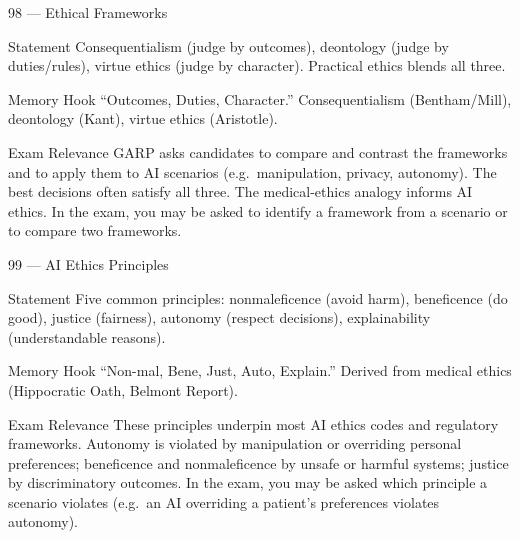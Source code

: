 \documentclass[aspectratio=169,8pt]{beamer}
\begin{document}
	\begin{frame}{98 --- Ethical Frameworks}
		\begin{block}{Statement}
			Consequentialism (judge by outcomes), deontology (judge by duties/rules), virtue ethics (judge by character). Practical ethics blends all three.
		\end{block}
		\begin{block}{Memory Hook}
			``Outcomes, Duties, Character.'' Consequentialism (Bentham/Mill), deontology (Kant), virtue ethics (Aristotle).
		\end{block}
		\begin{block}{Exam Relevance}
			GARP asks candidates to compare and contrast the frameworks and to apply them to AI scenarios (e.g.\ manipulation, privacy, autonomy). The best decisions often satisfy all three. The medical-ethics analogy informs AI ethics. In the exam, you may be asked to identify a framework from a scenario or to compare two frameworks.
		\end{block}
	\end{frame}
	
	\begin{frame}{99 --- AI Ethics Principles}
		\begin{block}{Statement}
			Five common principles: nonmaleficence (avoid harm), beneficence (do good), justice (fairness), autonomy (respect decisions), explainability (understandable reasons).
		\end{block}
		\begin{block}{Memory Hook}
			``Non-mal, Bene, Just, Auto, Explain.'' Derived from medical ethics (Hippocratic Oath, Belmont Report).
		\end{block}
		\begin{block}{Exam Relevance}
			These principles underpin most AI ethics codes and regulatory frameworks. Autonomy is violated by manipulation or overriding personal preferences; beneficence and nonmaleficence by unsafe or harmful systems; justice by discriminatory outcomes. In the exam, you may be asked which principle a scenario violates (e.g.\ an AI overriding a patient's preferences violates autonomy).
		\end{block}
	\end{frame}
	
\end{document}
